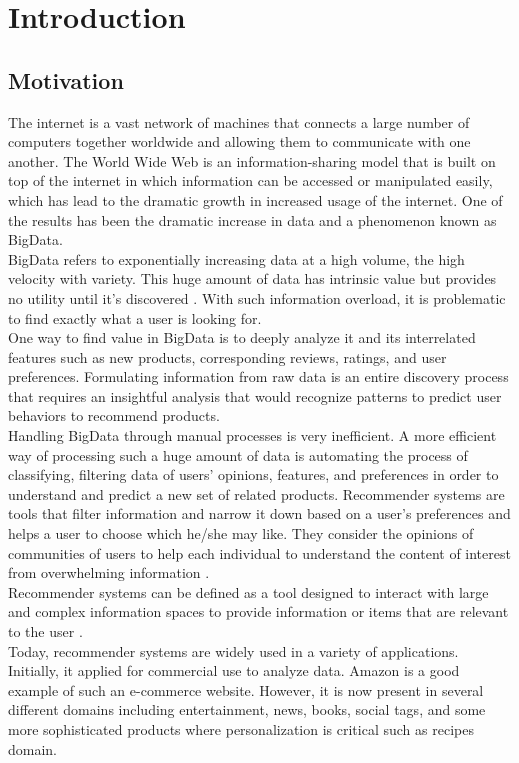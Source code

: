 \chapter{Introduction}
\section{Motivation}
The internet is a vast network of machines that connects a large number of computers together worldwide and allowing them to communicate with one another. The World Wide Web is an information-sharing model that is built on top of the internet in which information can be accessed or manipulated easily, which has lead to the dramatic growth in increased usage of the internet. One of the results has been the dramatic increase in data and a phenomenon known as BigData.
\\
BigData refers to exponentially increasing data at a high volume, the high velocity with variety. This huge amount of data has intrinsic value but provides no utility until it's discovered \cite{2}. With such information overload, it is problematic to find exactly what a user is looking for.
\\
One way to find value in BigData is to deeply analyze it and its interrelated features such as new products, corresponding reviews, ratings, and user preferences. Formulating information from raw data is an entire discovery process that requires an insightful analysis that would recognize patterns to predict user behaviors to recommend products.
\\
Handling BigData through manual processes is very inefficient. A more efficient way of processing such a huge amount of data is automating the process of classifying, filtering data of users' opinions, features, and preferences in order to understand and predict a new set of related products. Recommender systems are tools that filter information and narrow it down based on a user's preferences and helps a user to choose which he/she may like. They consider the opinions of communities of users to help each individual to understand the content of interest from overwhelming information \cite{1}.
\\
Recommender systems can be defined as a tool designed to interact with large and complex information spaces to provide information or items that are relevant to the user \cite{4}.
\\
Today, recommender systems are widely used in a variety of applications. Initially, it applied for commercial use to analyze data. Amazon is a good example of such an e-commerce website. However, it is now present in several different domains including entertainment, news, books, social tags, and some more sophisticated products where personalization is critical such as recipes domain.
